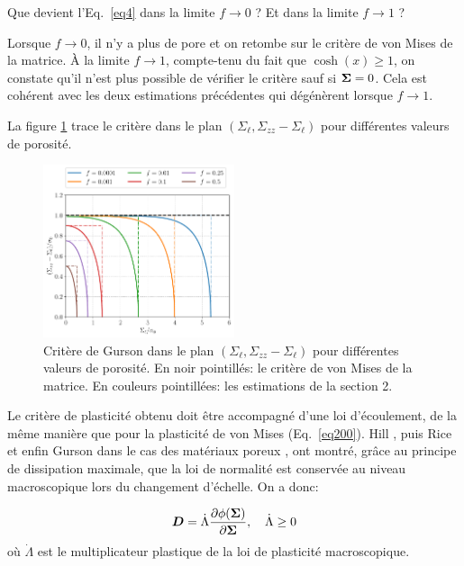 \documentclass[french,12pt]{exam}
\begin{document}
\begin{questions}
\question Que devient l'Eq.~\eqref{eq4} dans la limite $f \to 0$ ? Et dans la limite $f \to 1$ ?
\begin{solution}
Lorsque $f\to 0$, il n'y a plus de pore et on retombe sur le critère de von Mises de la matrice. \`A la limite $f\to 1$, compte-tenu du fait que $\cosh(x)\geq 1$, on constate qu'il n'est plus possible de vérifier le critère sauf si $\boldsymbol{\Sigma}=0$.
Cela est cohérent avec les deux estimations précédentes qui dégénèrent lorsque $f\to 1$.
\end{solution}

La figure \ref{fig:Gurson_crit} trace le critère dans le plan $(\Sigma_\ell, \Sigma_{zz} - \Sigma_\ell)$ pour différentes valeurs de porosité.

\begin{figure}
\begin{center}
\includegraphics[width=0.5\textwidth]{Gurson_cylinder}
\end{center}
\caption{Critère de Gurson dans le plan $(\Sigma_\ell, \Sigma_{zz} - \Sigma_\ell)$ pour différentes valeurs de porosité. En noir pointillés: le critère de von Mises de la matrice. En couleurs pointillées: les estimations de la section 2.}
\label{fig:Gurson_crit}
\end{figure}

Le critère de plasticité obtenu doit être accompagné d'une loi d'écoulement, de la même manière que pour la plasticité de von Mises (Eq.~\ref{eq200}). Hill \cite{hill}, puis Rice \cite{rice} et enfin Gurson \cite{gurson} dans le cas des matériaux poreux , ont montré, grâce au principe de dissipation maximale, que la loi de normalité est conservée au niveau macroscopique lors du changement d'échelle. On a donc:

  \begin{equation}
     \boldsymbol{D} = \dot{\Lambda} \frac{\partial \phi(\boldsymbol{\Sigma})}{\partial \boldsymbol{\Sigma}},  \quad \dot{\Lambda}\geq 0
  \end{equation}
où $\dot{\Lambda}$ est le multiplicateur plastique de la loi de plasticité macroscopique.


\end{questions}
\end{document}
